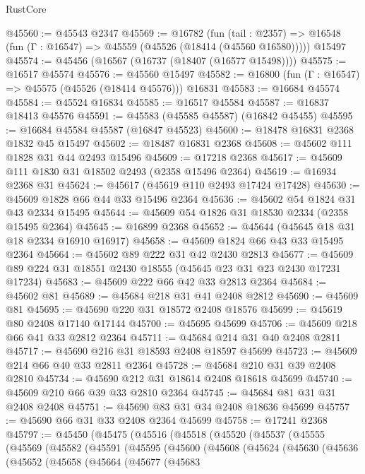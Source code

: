 \begin{lexlean}{RustCore}
\begin{coremodule}
@45560 := @45543 @2347
@45569 := @16782
    (fun (tail : @2357) => @16548 (fun (Γ : @16547) => @45559 (@45526 (@18414 (@45560 @16580)))))
    @15497
@45574 := @45456 (@16567 (@16737 (@18407 (@16577 @15498))))
@45575 := @16517 @45574
@45576 := @45560 @15497
@45582 := @16800 (fun (Γ : @16547) => @45575 (@45526 (@18414 @45576))) @16831
@45583 := @16684 @45574
@45584 := @45524 @16834
@45585 := @16517 @45584
@45587 := @16837 @18413 @45576
@45591 := @45583 (@45585 @45587) (@16842 @45455)
@45595 := @16684 @45584 @45587 (@16847 @45523)
@45600 := @18478 @16831 @2368 @1832 @45 @15497
@45602 := @18487 @16831 @2368
@45608 := @45602 @111 @1828 @31 @44 @2493 @15496
@45609 := @17218 @2368
@45617 := @45609 @111 @1830 @31 @18502 @2493 (@2358 @15496 @2364)
@45619 := @16934 @2368 @31
@45624 := @45617 (@45619 @110 @2493 @17424 @17428)
@45630 := @45609 @1828 @66 @44 @33 @15496 @2364
@45636 := @45602 @54 @1824 @31 @43 @2334 @15495
@45644 := @45609 @54 @1826 @31 @18530 @2334 (@2358 @15495 @2364)
@45645 := @16899 @2368
@45652 := @45644 (@45645 @18 @31 @18 @2334 @16910 @16917)
@45658 := @45609 @1824 @66 @43 @33 @15495 @2364
@45664 := @45602 @89 @222 @31 @42 @2430 @2813
@45677 := @45609 @89 @224 @31 @18551 @2430 @18555 (@45645 @23 @31 @23 @2430 @17231 @17234)
@45683 := @45609 @222 @66 @42 @33 @2813 @2364
@45684 := @45602 @81
@45689 := @45684 @218 @31 @41 @2408 @2812
@45690 := @45609 @81
@45695 := @45690 @220 @31 @18572 @2408 @18576
@45699 := @45619 @80 @2408 @17140 @17144
@45700 := @45695 @45699
@45706 := @45609 @218 @66 @41 @33 @2812 @2364
@45711 := @45684 @214 @31 @40 @2408 @2811
@45717 := @45690 @216 @31 @18593 @2408 @18597 @45699
@45723 := @45609 @214 @66 @40 @33 @2811 @2364
@45728 := @45684 @210 @31 @39 @2408 @2810
@45734 := @45690 @212 @31 @18614 @2408 @18618 @45699
@45740 := @45609 @210 @66 @39 @33 @2810 @2364
@45745 := @45684 @81 @31 @31 @2408 @2408
@45751 := @45690 @83 @31 @34 @2408 @18636 @45699
@45757 := @45690 @66 @31 @33 @2408 @2364 @45699
@45758 := @17241 @2368
@45797 := @45450
    (@45475
      (@45516
        (@45518
          (@45520
            (@45537
              (@45555
                (@45569
                  (@45582
                    (@45591
                      (@45595
                        (@45600
                          (@45608
                            (@45624
                              (@45630
                                (@45636
                                  (@45652
                                    (@45658
                                      (@45664
                                        (@45677
                                          (@45683

\end{coremodule}
\end{lexlean}
